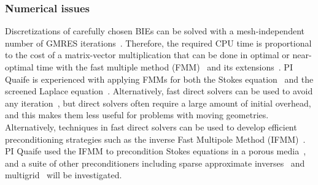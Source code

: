 \subsubsection{Numerical issues}
\label{subsec:NumericalIssues}

Discretizations of carefully chosen BIEs can be solved with a
mesh-independent number of GMRES
iterations~\cite{cam-ips-kel-mey-xue1996}. Therefore, the required CPU
time is proportional to the cost of a matrix-vector multiplication that
can be done in optimal or near-optimal time with the fast multiple
method (FMM)~\cite{fmm5} and its extensions~\cite{fmm1, fmm2, fmm3,
fmm4, fmm6, fmm7, fmm8}. PI Quaife is experienced with applying FMMs for
both the Stokes equation~\cite{qua-bir2014, bys-sha-qua2020} and the
screened Laplace equation~\cite{kro-qua2011, qua2011}. Alternatively,
fast direct solvers can be used to avoid any iteration~\cite{fds1, fds2,
fds3, fds4, fds5, fds6, fds7, fds8, ho2016cpam2, ho2016cpam1,
minden2016, minden2017siammms}, but direct solvers often require a large
amount of initial overhead, and this makes them less useful for problems
with moving geometries. Alternatively, techniques in fast direct solvers
can be used to develop efficient preconditioning strategies such as the
inverse Fast Multipole Method (IFMM)~\cite{cou-pou-dar2017}. PI Quaife
used the IFMM to precondition Stokes equations in a porous
media~\cite{qua-cou-dar2018}, and a suite of other preconditioners
including sparse approximate inverses~\cite{che2000} and
multigrid~\cite{hem-sch1981, sch1982} will be investigated.

